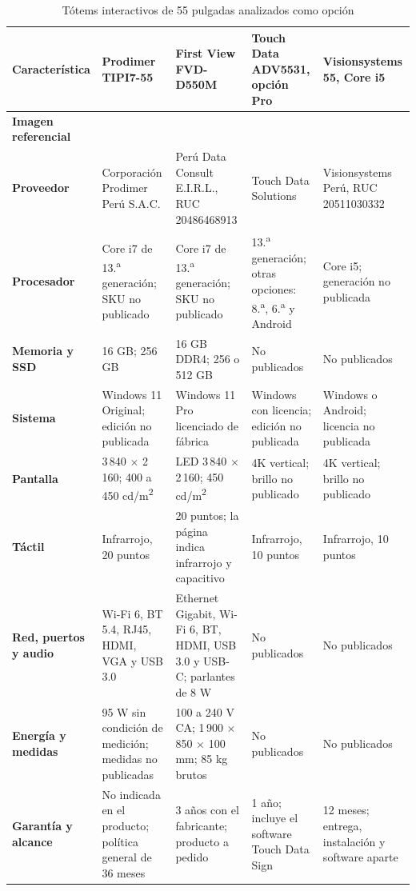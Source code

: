 \begin{table}[p]\formatofichas
\caption{Tótems interactivos de 55 pulgadas analizados como opción}\label{tab:fichas-totems}
\begin{tabularx}{\linewidth}{@{}>{\raggedright\arraybackslash}p{2.15cm}YYYY@{}}
\toprule
\textbf{Característica} & \textbf{Prodimer TIPI7-55} & \textbf{First View FVD-D550M} & \textbf{Touch Data ADV5531, opción Pro} & \textbf{Visionsystems 55, Core i5}\\\midrule
\textbf{Imagen referencial} &  &  &  & \\
\textbf{Proveedor} & Corporación Prodimer Perú S.A.C. & Perú Data Consult E.I.R.L., RUC 20486468913 & Touch Data Solutions & Visionsystems Perú, RUC 20511030332\\
\textbf{Procesador} & Core i7 de 13.\textsuperscript{a} generación; SKU no publicado & Core i7 de 13.\textsuperscript{a} generación; SKU no publicado & 13.\textsuperscript{a} generación; otras opciones: 8.\textsuperscript{a}, 6.\textsuperscript{a} y Android & Core i5; generación no publicada\\
\textbf{Memoria y SSD} & 16 GB; 256 GB & 16 GB DDR4; 256 o 512 GB & No publicados & No publicados\\
\textbf{Sistema} & Windows 11 Original; edición no publicada & Windows 11 Pro licenciado de fábrica & Windows con licencia; edición no publicada & Windows o Android; licencia no publicada\\
\textbf{Pantalla} & 3\,840 $\times$ 2\,160; 400 a 450 cd/m\textsuperscript{2} & LED 3\,840 $\times$ 2\,160; 450 cd/m\textsuperscript{2} & 4K vertical; brillo no publicado & 4K vertical; brillo no publicado\\
\textbf{Táctil} & Infrarrojo, 20 puntos & 20 puntos; la página indica infrarrojo y capacitivo & Infrarrojo, 10 puntos & Infrarrojo, 10 puntos\\
\textbf{Red, puertos y audio} & Wi-Fi 6, BT 5.4, RJ45, HDMI, VGA y USB 3.0 & Ethernet Gigabit, Wi-Fi 6, BT, HDMI, USB 3.0 y USB-C; parlantes de 8 W & No publicados & No publicados\\
\textbf{Energía y medidas} & 95 W sin condición de medición; medidas no publicadas & 100 a 240 V CA; 1\,900 $\times$ 850 $\times$ 100 mm; 85 kg brutos & No publicados & No publicados\\
\textbf{Garantía y alcance} & No indicada en el producto; política general de 36 meses & 3 años con el fabricante; producto a pedido & 1 año; incluye el software Touch Data Sign & 12 meses; entrega, instalación y software aparte\\

\end{tabularx}
\end{table}
